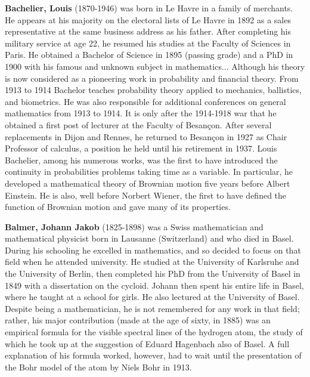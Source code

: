 \pichskip{15pt}%
\textbf{Bachelier, Louis} (1870-1946) was born in Le Havre in a family of merchants. He appears at his majority on the electoral lists of Le Havre in 1892 as a sales representative at the same business address as his father. After completing his military service at age 22, he resumed his studies at the Faculty of Sciences in Paris. He obtained a Bachelor of Science in 1895 (passing grade) and a PhD in 1900 with his famous and unknown subject in mathematics... Although his theory is now considered as a pioneering work in probability and financial theory. From 1913 to 1914 Bachelor teaches probability theory applied to mechanics, ballistics, and biometrics. He was also responsible for additional conferences on general mathematics from 1913 to 1914. It is only after the 1914-1918 war that he obtained a first post of lecturer at the Faculty of Besançon. After several replacements in Dijon and Rennes, he returned to Besançon in 1927 as Chair Professor of calculus, a position he held until his retirement in 1937. Louis Bachelier, among his numerous works, was the first to have introduced the continuity in probabilities problems taking time as a variable. In particular, he developed a mathematical theory of Brownian motion five years before Albert Einstein. He is also, well before Norbert Wiener, the first to have defined the function of Brownian motion and gave many of its properties.

\textbf{Balmer, Johann Jakob} (1825-1898) was a Swiss mathematician and mathematical physicist born in Lausanne (Switzerland) and who died in Basel. During his schooling he excelled in mathematics, and so decided to focus on that field when he attended university. He studied at the University of Karlsruhe and the University of Berlin, then completed his PhD from the University of Basel in 1849 with a dissertation on the cycloid. Johann then spent his entire life in Basel, where he taught at a school for girls. He also lectured at the University of Basel. Despite being a mathematician, he is not remembered for any work in that field; rather, his major contribution (made at the age of sixty, in 1885) was an empirical formula for the visible spectral lines of the hydrogen atom, the study of which he took up at the suggestion of Eduard Hagenbach also of Basel. A full explanation of his formula worked, however, had to wait until the presentation of the Bohr model of the atom by Niels Bohr in 1913.

